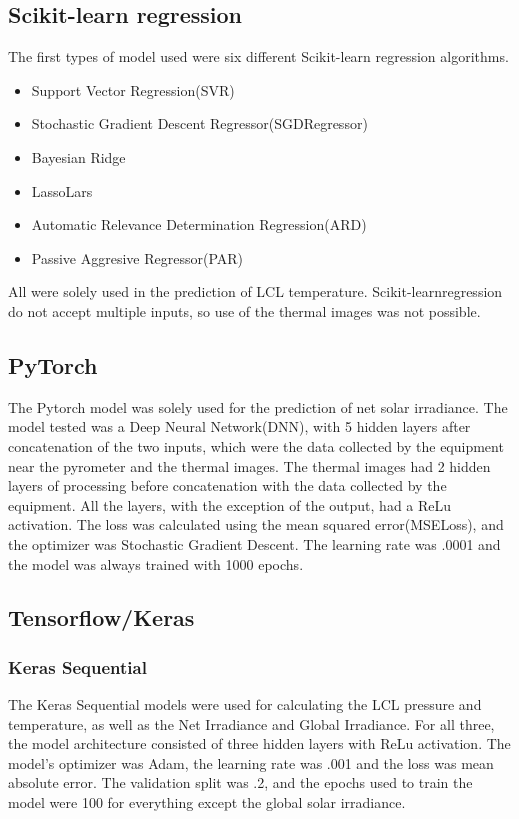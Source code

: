 \documentclass[conference]{IEEEtran}
\begin{document}
\subsection{Scikit-learn regression}
The first types of model used were six different Scikit-learn regression algorithms.
\begin{itemize}
\item Support Vector Regression(SVR)
\item Stochastic Gradient Descent Regressor(SGDRegressor)
\item Bayesian Ridge
\item LassoLars 
\item Automatic Relevance Determination Regression(ARD)
\item Passive Aggresive Regressor(PAR)
\end{itemize}
 All were solely used in the prediction of LCL temperature. Scikit-learnregression do not accept multiple inputs, so use of the thermal images was not possible.
\subsection{PyTorch}
The Pytorch model was solely used for the prediction of net solar irradiance. The model tested was a Deep Neural Network(DNN), with 5 hidden layers after concatenation of the two inputs, which were the data collected by the equipment near the pyrometer
and the thermal images. The thermal images had 2 hidden layers of processing before concatenation with the data collected by the equipment. All the layers, with the exception of the output, had a ReLu activation. The loss was calculated using the mean squared error(MSELoss), and the optimizer was Stochastic Gradient 
Descent. The learning rate was .0001 and the model was always trained with 1000 epochs.
\subsection{Tensorflow/Keras}
\subsubsection{Keras Sequential}
The Keras Sequential models were used for calculating the LCL pressure and temperature, as well as the Net Irradiance and Global Irradiance. For all three, the model architecture consisted of three hidden layers with ReLu activation. The model's optimizer was Adam, the learning rate
was .001 and the loss was mean absolute error. The validation split was .2, and the epochs used to train the model were 100 for everything except the global solar irradiance. 
\end{document}
